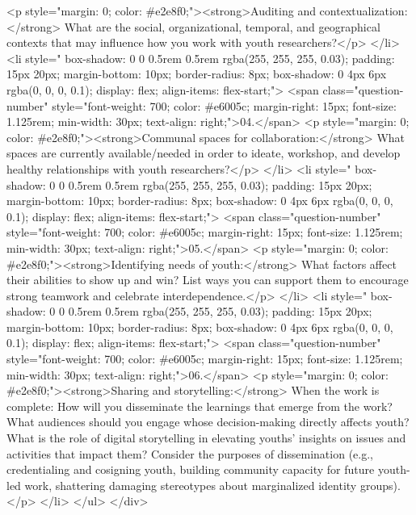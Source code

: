                     <p style="margin: 0; color: #e2e8f0;"><strong>Auditing and contextualization:</strong> What are the social, organizational, temporal, and geographical contexts that may influence how you work with youth researchers?</p>
                </li>
                <li style="  box-shadow: 0 0 0.5rem 0.5rem rgba(255, 255, 255, 0.03); padding: 15px 20px; margin-bottom: 10px; border-radius: 8px; box-shadow: 0 4px 6px rgba(0, 0, 0, 0.1); display: flex; align-items: flex-start;">
                    <span class="question-number" style="font-weight: 700; color: #e6005c; margin-right: 15px; font-size: 1.125rem; min-width: 30px; text-align: right;">04.</span>
                    <p style="margin: 0; color: #e2e8f0;"><strong>Communal spaces for collaboration:</strong> What spaces are currently available/needed in order to ideate, workshop, and develop healthy relationships with youth researchers?</p>
                </li>
                <li style="  box-shadow: 0 0 0.5rem 0.5rem rgba(255, 255, 255, 0.03); padding: 15px 20px; margin-bottom: 10px; border-radius: 8px; box-shadow: 0 4px 6px rgba(0, 0, 0, 0.1); display: flex; align-items: flex-start;">
                    <span class="question-number" style="font-weight: 700; color: #e6005c; margin-right: 15px; font-size: 1.125rem; min-width: 30px; text-align: right;">05.</span>
                    <p style="margin: 0; color: #e2e8f0;"><strong>Identifying needs of youth:</strong> What factors affect their abilities to show up and win? List ways you can support them to encourage strong teamwork and celebrate interdependence.</p>
                </li>
                <li style="  box-shadow: 0 0 0.5rem 0.5rem rgba(255, 255, 255, 0.03); padding: 15px 20px; margin-bottom: 10px; border-radius: 8px; box-shadow: 0 4px 6px rgba(0, 0, 0, 0.1); display: flex; align-items: flex-start;">
                    <span class="question-number" style="font-weight: 700; color: #e6005c; margin-right: 15px; font-size: 1.125rem; min-width: 30px; text-align: right;">06.</span>
                    <p style="margin: 0; color: #e2e8f0;"><strong>Sharing and storytelling:</strong> When the work is complete: How will you disseminate the learnings that emerge from the work? What audiences should you engage whose decision-making directly affects youth? What is the role of digital storytelling in elevating youths’ insights on issues and activities that impact them? Consider the purposes of dissemination (e.g., credentialing and cosigning youth, building community capacity for future youth-led work, shattering damaging stereotypes about marginalized identity groups).</p>
                </li>
            </ul>
        </div>

